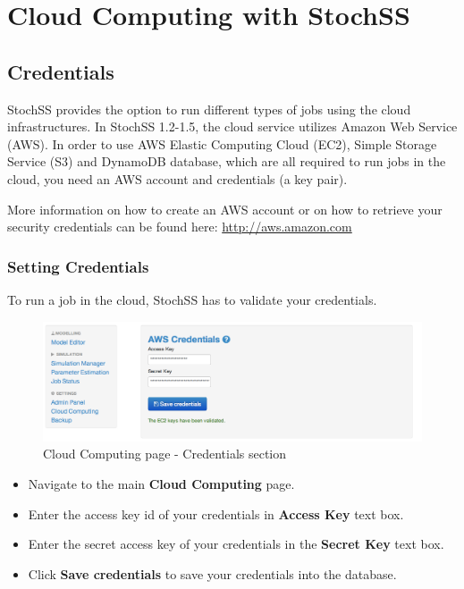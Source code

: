 \chapter{Cloud Computing with StochSS}

\section{Credentials}
StochSS provides the option to run different types of jobs using the cloud infrastructures. In StochSS 1.2-1.5, the cloud service utilizes Amazon Web Service (AWS). In order to use AWS Elastic Computing Cloud (EC2), Simple Storage Service (S3) and DynamoDB database, which are all required to run jobs in the cloud, you need an AWS account and credentials (a key pair). 

More information on how to create an AWS account or on how to retrieve your security credentials can be found here: \url{http://aws.amazon.com}

\subsection{Setting Credentials}
To run a job in the cloud, StochSS has to validate your credentials.

\begin{figure}[!ht]
\centering
\includegraphics[scale=0.45]{T6/T6_fig_credentials.png}
\caption{Cloud Computing page - Credentials section}
\label{fig:2}
\end{figure}

\begin{itemize}
\item Navigate to the main \textbf{Cloud Computing} page.
\item Enter the access key id of your credentials in \textbf{Access Key} text box.
 \item Enter the secret access key of your credentials in the \textbf{Secret Key} text box. 
 \item Click \textbf{Save credentials} to save your credentials into the database. %

\end{itemize}

